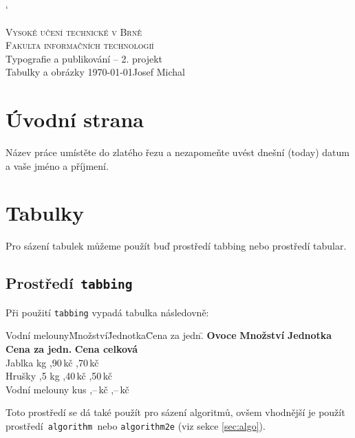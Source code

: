 \documentclass[a4paper, 11pt]{article}
\begin{document}
\catcode`
\begin{titlepage}
    
    \begin{center}
        \Huge
        \textsc{Vysoké učení technické v Brně}\\
        \huge
        \textsc{Fakulta informačních technologií\\}
        \vspace{0.382\textheight}
        \huge
        Typografie a publikování -- 2. projekt\\
        \Huge{Tabulky a obrázky}
        \vfill
        {\LARGE \today \hfill Josef Michal}
    \end{center}
    
\end{titlepage}



\section{Úvodní strana}
Název práce umístěte do zlatého řezu a nezapomeňte uvést dnešní (today) datum a vaše jméno a příjmení.



\section{Tabulky}
Pro sázení tabulek můžeme použít buď prostředí tabbing nebo prostředí tabular.



\subsection{Prostředí\texttt{ tabbing}}
Při použití \texttt{tabbing} vypadá tabulka následovně:
\begin{tabbing}
    Vodní melouny\quad \= Množství\quad \= Jednotka\quad \= Cena za jedn.\quad \= \kill
    \textbf{Ovoce} \> \textbf{Množství} \> \textbf{Jednotka} \> \textbf{Cena za jedn.} \> \textbf{Cena celková}\\
    Jablka  \> kg ,90\,kč ,70\,kč\\
    Hrušky ,5 \> kg ,40\,kč ,50\,kč\\
    Vodní melouny  \> kus ,--\,kč ,--\,kč\\
\end{tabbing}
Toto prostředí se dá také použít pro sázení algoritmů, ovšem vhodnější je použít prostředí\texttt{ algorithm }nebo \texttt{algorithm2e} (viz sekce \ref{sec:algo}).
\end{document}
